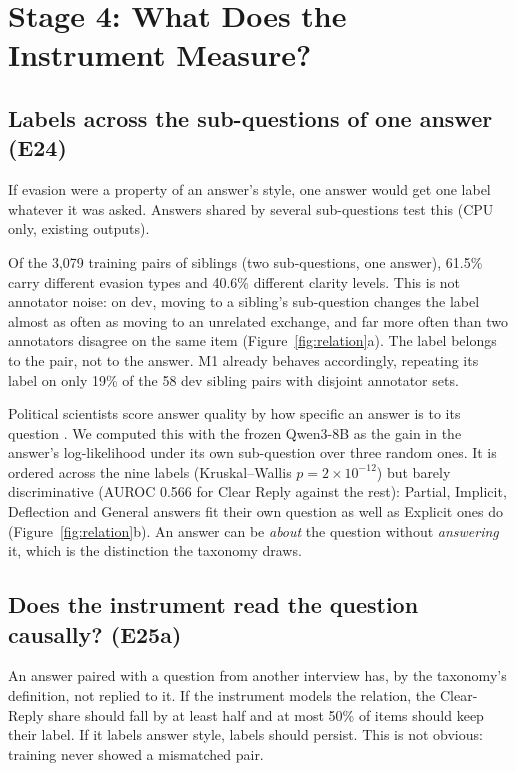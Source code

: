 \section{Stage 4: What Does the Instrument Measure?}
\label{sec:measure}

\subsection{Labels across the sub-questions of one answer (E24)}
\label{sec:relation}
\FigureRelation

If evasion were a property of an answer's style, one answer would get one label whatever it was asked. Answers shared by several sub-questions test this (CPU only, existing outputs).

Of the 3,079 training pairs of siblings (two sub-questions, one answer), 61.5\% carry different evasion types and 40.6\% different clarity levels.
This is not annotator noise: on dev, moving to a sibling's sub-question changes the label almost as often as moving to an unrelated exchange, and far more often than two annotators disagree on the same item (Figure~\ref{fig:relation}a).
The label belongs to the pair, not to the answer.
M1 already behaves accordingly, repeating its label on only 19\% of the 58 dev sibling pairs with disjoint annotator sets.

Political scientists score answer quality by how specific an answer is to its question \citep{alvarez-morrier-2025-measuring}. We computed this with the frozen Qwen3-8B as the gain in the answer's log-likelihood under its own sub-question over three random ones.
It is ordered across the nine labels (Kruskal--Wallis $p = 2 \times 10^{-12}$) but barely discriminative (AUROC 0.566 for Clear Reply against the rest): Partial, Implicit, Deflection and General answers fit their own question as well as Explicit ones do (Figure~\ref{fig:relation}b).
An answer can be \emph{about} the question without \emph{answering} it, which is the distinction the taxonomy draws.

\subsection{Does the instrument read the question causally? (E25a)}

An answer paired with a question from another interview has, by the taxonomy's definition, not replied to it.
If the instrument models the relation, the Clear-Reply share should fall by at least half and at most 50\% of items should keep their label. If it labels answer style, labels should persist.
This is not obvious: training never showed a mismatched pair.

